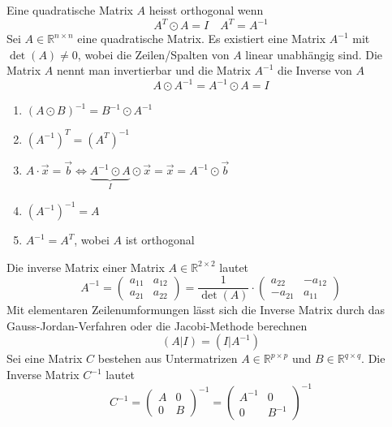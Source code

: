 Eine quadratische Matrix $A$ heisst orthogonal wenn
\begin{equation}
\boxed{A^T\odot A=I}\quad \boxed{A^T=A^{-1}}
\end{equation}
Sei $A\in\mathbb{R}^{n\times n}$ eine quadratische Matrix. Es existiert eine Matrix $A^{-1}$ mit $\det\left(A\right)\neq 0$, wobei die Zeilen/Spalten von $A$ linear unabhängig sind. Die Matrix $A$ nennt man invertierbar und die Matrix $A^{-1}$ die Inverse von $A$
\begin{equation}
\boxed{A\odot A^{-1}=A^{-1}\odot A=I}
\end{equation}
\begin{enumerate}[$(i)$]
\item $\left(A\odot B\right)^{-1}=B^{-1}\odot A^{-1}$
\item $\left(A^{-1}\right)^T=\left(A^T\right)^{-1}$
\item $A\cdot \overrightarrow{x}=\overrightarrow{b}\Leftrightarrow \underbrace{ A^{-1}\odot A}_{I}\odot \overrightarrow{x}=\overrightarrow{x}=A^{-1}\odot\overrightarrow{b}$
\item $\left(A^{-1}\right)^{-1}=A$
\item $A^{-1}=A^T$, wobei $A$ ist orthogonal
\end{enumerate}
Die inverse Matrix einer Matrix $A\in\mathbb{R}^{2\times 2}$ lautet
\begin{equation}
\boxed{A^{-1}=\begin{pmatrix}a_{11}&a_{12}\\a_{21}&a_{22}\end{pmatrix}=\dfrac{1}{\det\left(A\right)}\cdot \begin{pmatrix}a_{22}&-a_{12}\\-a_{21}&a_{11}\end{pmatrix}}
\end{equation}
Mit elementaren Zeilenumformungen lässt sich die Inverse Matrix durch das Gauss-Jordan-Verfahren oder die Jacobi-Methode berechnen
\begin{equation}
\boxed{\left(A\Big\vert I\right)=\left(I\Big\vert A^{-1}\right)}
\end{equation}
Sei eine Matrix $C$ bestehen aus Untermatrizen $A\in\mathbb{R}^{p\times p}$ und $B\in\mathbb{R}^{q\times q}$. Die Inverse Matrix $C^{-1}$ lautet
\begin{equation}
\boxed{C^{-1}=\begin{pmatrix}A&0\\0&B\end{pmatrix}^{-1}=\begin{pmatrix}A^{-1}&0\\0&B^{-1}\end{pmatrix}^{-1}}
\end{equation}
